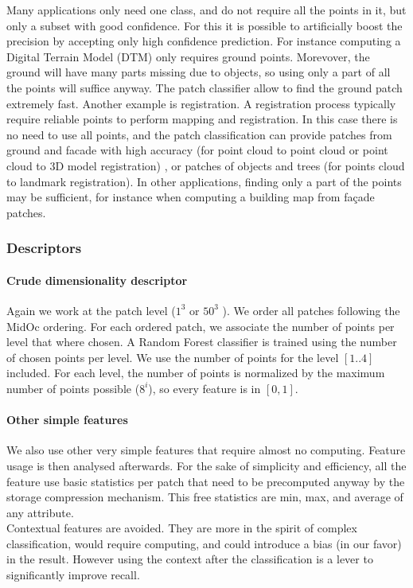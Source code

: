 		Many applications only need one class, and do not require all the points in it, but only a subset with good confidence.
		For this it is possible to artificially boost the precision by accepting only high confidence prediction.
		For instance computing a Digital Terrain Model (DTM) only requires ground points. Morevover, the ground will have many parts missing due to objects, so using only a part of all the points will suffice anyway. The patch classifier allow to find the ground patch extremely fast.
		Another example is registration. A registration process typically require reliable points to perform mapping and registration. In this case there is no need to use all points, and the patch classification can provide patches from ground and facade with high accuracy (for point cloud to point cloud or point cloud to 3D model registration) , or patches of objects and trees (for points cloud to landmark registration).
		In other applications, finding only a part of the points may be sufficient, for instance when computing a building map from façade patches.
		
		
		\subsubsection{Descriptors}  
		\paragraph{Crude dimensionality descriptor}
		Again we work at the patch level ($1^3$ or $50^3$ \cubic \meter).
		We order all patches following the MidOc ordering. For each ordered patch, we associate the number of points per level that where chosen.
		A Random Forest classifier is trained using the number of chosen points per level.
		We use the number of points for the level $[1..4]$ included. For each level, the number of points is normalized by the maximum number of points possible ($8^i$), so every feature is in $[0,1]$.
		
		\paragraph{Other simple features}
		We also use other very simple features that require almost no computing. Feature usage is then analysed afterwards.
		For the sake of simplicity and efficiency, all the feature use basic statistics per patch that need to be precomputed anyway by the storage compression mechanism. This free statistics are min, max, and average of any attribute.
		\\
		Contextual features are avoided. They are more in the spirit of complex classification, would require computing, and could introduce a bias (in our favor) in the result.
		However using the context after the classification is a lever to significantly improve recall.
		

